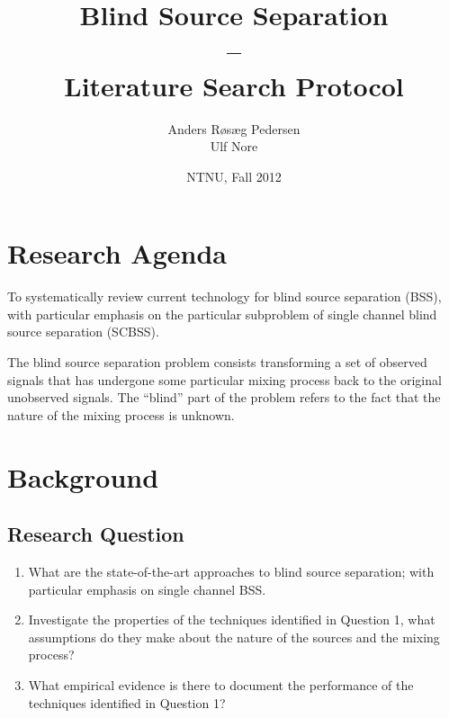 \documentclass[11pt, oneside, a4paper]{article}
\begin{document}

\title{Blind Source Separation\\--\\Literature Search Protocol}
\author{Anders Røsæg Pedersen\\Ulf Nore}
\date{NTNU, Fall 2012}    %
\maketitle


\tableofcontents



\section{Research Agenda}
To systematically review current technology for blind source separation (BSS), with particular emphasis on the particular subproblem of single channel blind source separation (SCBSS).

The blind source separation problem consists transforming a set of observed signals that has undergone some particular mixing process back to the original unobserved signals. The ``blind'' part of the problem refers to the fact that the nature of the mixing process is unknown. 

\section{Background}



\subsection*{Research Question}
\begin{enumerate}
  \item What are the state-of-the-art approaches to blind source separation; with particular emphasis on single channel BSS.
  \item Investigate the properties of the techniques identified in Question 1, what assumptions do they make about the nature of the sources and the mixing process?
  \item What empirical evidence is there to document the performance of the techniques identified in Question 1?
\end{enumerate}
\end{document}
